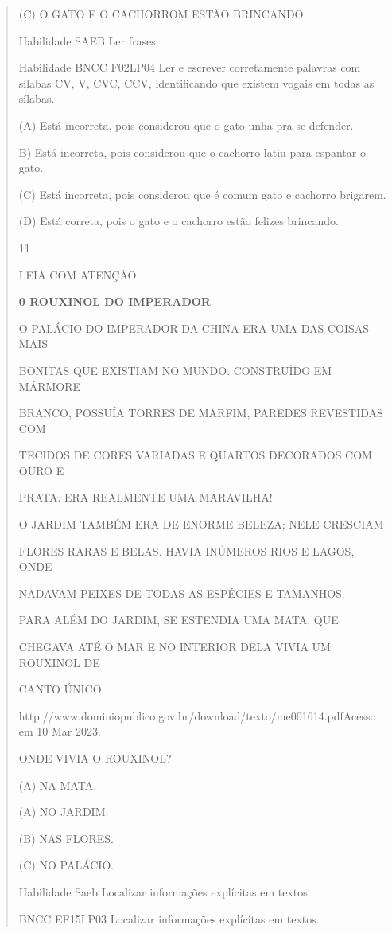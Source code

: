 {{{{\begin{verse}
{{\begin{escolha}
{{{{{(C) O GATO E O CACHORROM ESTÃO BRINCANDO.

\protect\hypertarget{_Hlk129376594}{}{}Habilidade SAEB Ler frases.

Habilidade BNCC F02LP04 Ler e escrever corretamente palavras com sílabas
CV, V, CVC, CCV, identificando que existem vogais em todas as sílabas.

(A) Está incorreta, pois considerou que o gato unha pra se defender.

B) Está incorreta, pois considerou que o cachorro latiu para espantar o
gato.

(C) Está incorreta, pois considerou que é comum gato e cachorro
brigarem.

(D) Está correta, pois o gato e o cachorro estão felizes brincando.

\num{11}

LEIA COM ATENÇÃO.

\textbf{0 ROUXINOL DO IMPERADOR}

O PALÁCIO DO IMPERADOR DA CHINA ERA UMA DAS COISAS MAIS

BONITAS QUE EXISTIAM NO MUNDO. CONSTRUÍDO EM MÁRMORE

BRANCO, POSSUÍA TORRES DE MARFIM, PAREDES REVESTIDAS COM

TECIDOS DE CORES VARIADAS E QUARTOS DECORADOS COM OURO E

PRATA. ERA REALMENTE UMA MARAVILHA!

O JARDIM TAMBÉM ERA DE ENORME BELEZA; NELE CRESCIAM

FLORES RARAS E BELAS. HAVIA INÚMEROS RIOS E LAGOS, ONDE

NADAVAM PEIXES DE TODAS AS ESPÉCIES E TAMANHOS.

PARA ALÉM DO JARDIM, SE ESTENDIA UMA MATA, QUE

CHEGAVA ATÉ O MAR E NO INTERIOR DELA VIVIA UM ROUXINOL DE

CANTO ÚNICO.

http://www.dominiopublico.gov.br/download/texto/me001614.pdfAcesso em 10
Mar 2023.

ONDE VIVIA O ROUXINOL?

(A) NA MATA.

(A) NO JARDIM.

(B) NAS FLORES.

(C) NO PALÁCIO.

Habilidade Saeb Localizar informações explícitas em textos.

BNCC EF15LP03 Localizar informações explícitas em textos.

}}}}}
\end{escolha}}}
\end{verse}}}}}
